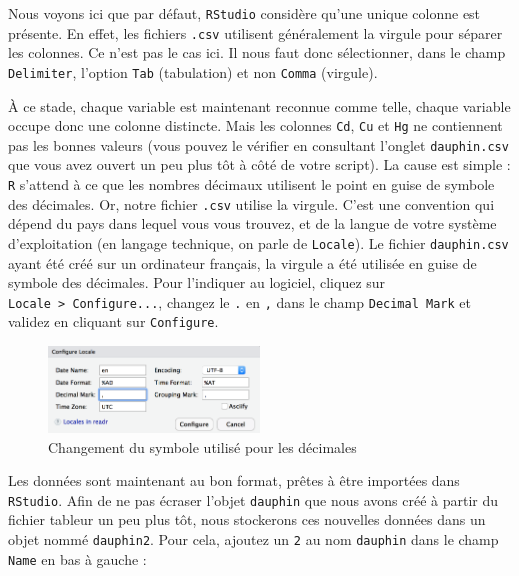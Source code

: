 \documentclass[
  letterpaper,
  DIV=11,
  numbers=noendperiod]{scrreprt}
\begin{document}
Nous voyons ici que par défaut, \texttt{RStudio} considère qu'une unique
colonne est présente. En effet, les fichiers \texttt{.csv} utilisent
généralement la virgule pour séparer les colonnes. Ce n'est pas le cas
ici. Il nous faut donc sélectionner, dans le champ \texttt{Delimiter},
l'option \texttt{Tab} (tabulation) et non \texttt{Comma} (virgule).

À ce stade, chaque variable est maintenant reconnue comme telle, chaque
variable occupe donc une colonne distincte. Mais les colonnes
\texttt{Cd}, \texttt{Cu} et \texttt{Hg} ne contiennent pas les bonnes
valeurs (vous pouvez le vérifier en consultant l'onglet
\texttt{dauphin.csv} que vous avez ouvert un peu plus tôt à côté de
votre script). La cause est simple : \texttt{R} s'attend à ce que les
nombres décimaux utilisent le point en guise de symbole des décimales.
Or, notre fichier \texttt{.csv} utilise la virgule. C'est une convention
qui dépend du pays dans lequel vous vous trouvez, et de la langue de
votre système d'exploitation (en langage technique, on parle de
\texttt{Locale}). Le fichier \texttt{dauphin.csv} ayant été créé sur un
ordinateur français, la virgule a été utilisée en guise de symbole des
décimales. Pour l'indiquer au logiciel, cliquez sur
\texttt{Locale\ \textgreater{}\ Configure...}, changez le \texttt{.} en
\texttt{,} dans le champ \texttt{Decimal\ Mark} et validez en cliquant
sur \texttt{Configure}.

\begin{figure}

{\centering \includegraphics[width=0.5\textwidth,height=\textheight]{./images/importcsv3.png}

}

\caption{Changement du symbole utilisé pour les décimales}

\end{figure}

Les données sont maintenant au bon format, prêtes à être importées dans
\texttt{RStudio}. Afin de ne pas écraser l'objet \texttt{dauphin} que
nous avons créé à partir du fichier tableur un peu plus tôt, nous
stockerons ces nouvelles données dans un objet nommé \texttt{dauphin2}.
Pour cela, ajoutez un \texttt{2} au nom \texttt{dauphin} dans le champ
\texttt{Name} en bas à gauche :
\end{document}
